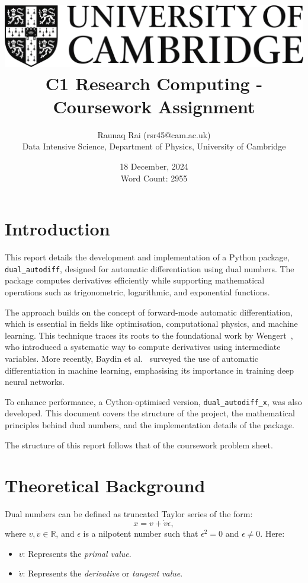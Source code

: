 \documentclass[a4paper,12pt]{article}
\title{
    \includegraphics[scale=0.4]{Cam_logo_bw.png}\\
    \vspace{0.5cm}
    C1 Research Computing - Coursework Assignment
}
\author{Raunaq Rai (rsr45@cam.ac.uk)\\
    Data Intensive Science, Department of Physics, University of Cambridge
}
\date{18 December, 2024 \\ \vspace{0.2cm} {\small Word Count: 2955}}
\begin{document}
\maketitle

\section*{Introduction}
This report details the development and implementation of a Python package, \texttt{dual\_autodiff}, designed for automatic differentiation using dual numbers. The package computes derivatives efficiently while supporting mathematical operations such as trigonometric, logarithmic, and exponential functions.

The approach builds on the concept of forward-mode automatic differentiation, which is essential in fields like optimisation, computational physics, and machine learning. This technique traces its roots to the foundational work by Wengert~\cite{wengert1964automatic}, who introduced a systematic way to compute derivatives using intermediate variables. More recently, Baydin et al.~\cite{baydin2018automatic} surveyed the use of automatic differentiation in machine learning, emphasising its importance in training deep neural networks.

To enhance performance, a Cython-optimised version, \texttt{dual\_autodiff\_x}, was also developed. This document covers the structure of the project, the mathematical principles behind dual numbers, and the implementation details of the package.

The structure of this report follows that of the coursework problem sheet.

\section*{Theoretical Background}

Dual numbers can be defined as truncated Taylor series of the form:
\begin{equation}
    x = v + \dot{v}\epsilon,
    \label{eq:dual_number_form}
    \end{equation}
where \(v, \dot{v} \in \mathbb{R}\), and \(\epsilon\) is a nilpotent number such that \(\epsilon^2 = 0\) and \(\epsilon \neq 0\). Here:
\begin{itemize}
    \item \(v\): Represents the \textit{primal value}.
    \item \(\dot{v}\): Represents the \textit{derivative} or \textit{tangent value}.
\end{itemize}
\end{document}
